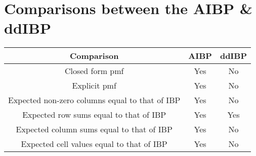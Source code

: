 \section{Comparisons between the AIBP \& ddIBP}
\begin{center}
  \begin{tabular}{c|c|c}
    \hline
      Comparison & AIBP & ddIBP \\ \hline \hline
      Closed form pmf & Yes & No \\ \hline
      Explicit pmf & Yes & No \\ \hline
      Expected non-zero columns equal to that of IBP & Yes & No \\ \hline
      Expected row sums equal to that of IBP & Yes & Yes \\ \hline
      Expected column sums equal to that of IBP & Yes & No \\ \hline
      Expected cell values equal to that of IBP & Yes & No \\ \hline
    \hline
  \end{tabular}
\end{center}

